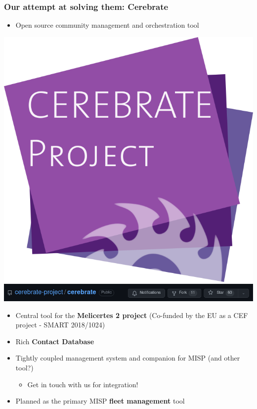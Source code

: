 \begin{frame}
\frametitle{Our attempt at solving them: Cerebrate}
    \begin{itemize}
        \item Open source community management and orchestration tool
    \end{itemize}
    \begin{center}
        \includegraphics[width=0.15\linewidth]{pictures/logo.png}
        \linebreak
        \includegraphics[width=0.99\linewidth]{pictures/cerebrate-github.png}
    \end{center}
    \begin{itemize}
        \item Central tool for the \textbf{Melicertes 2 project} (Co-funded by the EU as a CEF project - SMART 2018/1024)
        \item Rich \textbf{Contact Database}
        \item Tightly coupled management system and companion for MISP (and other tool?)
        \begin{itemize}
            \item Get in touch with us for integration!
        \end{itemize}
        \item Planned as the primary MISP \textbf{fleet management} tool
    \end{itemize}
\end{frame}

